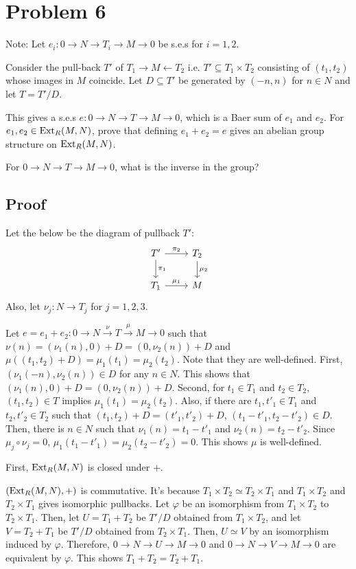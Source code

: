 \section*{Problem 6}

Note:
Let \(e_i: 0 \to N \to T_i \to M \to 0\) be s.e.s for \(i = 1, 2\).

Consider the pull-back \(T'\) of \(T_1 \to M \leftarrow T_2\)
i.e. \(T' \subseteq T_1 \times T_2\)
consisting of \((t_1, t_2)\) whose images in \(M\) coincide.
Let \(D \subseteq T'\) be generated by \((-n ,n)\) for \(n \in N\)
and let \(T = T'/D\).

This gives a s.e.s \(e: 0 \to N \to T \to M \to 0\), which is a Baer sum of \(e_1\) and \(e_2\).
\br
\noindent
For \(e_1, e_2 \in \textnormal{Ext}_R(M, N)\),
prove that defining \(e_1 + e_2 = e\) gives an abelian group structure on \(\textnormal{Ext}_R(M, N)\).

For \(0 \to N \to T \to M \to 0\), what is the inverse in the group?

\subsection*{Proof}

Let the below be the diagram of pullback \(T'\):
\[\begin{tikzcd}
  T' \ar["\pi_1"]{d} \ar["\pi_2"]{r} & T_2 \ar["\mu_2"]{d} \\
  T_1 \ar["\mu_1"]{r} & M
\end{tikzcd}\]
Also, let \(\nu_j: N \to T_j\) for \(j = 1, 2, 3\).

Let \(e = e_1 + e_2: 0 \to N \xrightarrow{\nu} T \xrightarrow{\mu} M \to 0\) such that
\(\nu(n) = (\nu_1(n), 0) + D = (0, \nu_2(n)) + D\)
and
\(\mu((t_1, t_2) + D) = \mu_1(t_1) = \mu_2(t_2)\).
Note that they are well-defined.
First, \((\nu_1(-n), \nu_2(n)) \in D\) for any \(n \in N\).
This shows that
\((\nu_1(n), 0) + D = (0, \nu_2(n)) + D\).
Second, for \(t_1 \in T_1\) and \(t_2 \in T_2\),
\((t_1, t_2) \in T\) implies \(\mu_1(t_1) = \mu_2(t_2)\).
Also, if there are \(t_1, t'_1 \in T_1\) and \(t_2, t'_2 \in T_2\)
such that \((t_1, t_2) + D = (t'_1, t'_2) + D\),
\((t_1 - t'_1, t_2 - t'_2) \in D\).
Then, there is \(n \in N\) such that \(\nu_1(n) = t_1 - t'_1\) and \(\nu_2(n) = t_2 - t'_2\).
Since \(\mu_j \circ \nu_j = 0\),
\(\mu_1(t_1 - t'_1) = \mu_2(t_2 - t'_2) = 0\).
This shows \(\mu\) is well-defined.

First, \(\textnormal{Ext}_R(M, N)\) is closed under \(+\).

\((\textnormal{Ext}_R(M, N), +)\) is commutative.
It's because \(T_1 \times T_2 \simeq T_2 \times T_1\)
and \(T_1 \times T_2\) and \(T_2 \times T_1\) gives isomorphic pullbacks.
Let \(\varphi\) be an isomorphism from \(T_1 \times T_2\) to \(T_2 \times T_1\).
Then, let \(U = T_1 + T_2\) be \(T' / D\) obtained from \(T_1 \times T_2\),
and let \(V = T_2 + T_1\) be \(T' / D\) obtained from \(T_2 \times T_1\).
Then, \(U \simeq V\) by an isomorphism induced by \(\varphi\).
Therefore, \(0 \to N \to U \to M \to 0\) and \(0 \to N \to V \to M \to 0\) are equivalent by \(\varphi\).
This shows \(T_1 + T_2 = T_2 + T_1\).

